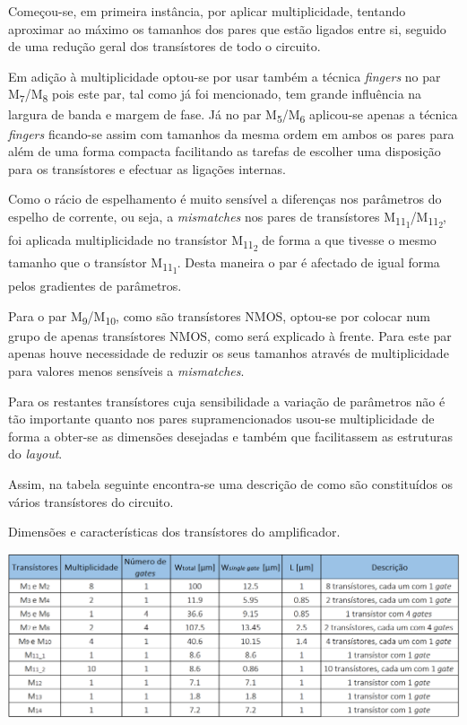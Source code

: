 \documentclass[11pt]{article}
\numberwithin{equation}{section}
\begin{document}
Começou-se, em primeira instância, por aplicar multiplicidade, tentando aproximar ao máximo os tamanhos dos pares que estão ligados entre si, seguido de uma redução geral dos transístores de todo o circuito. 

Em adição à multiplicidade optou-se por usar também a técnica \textit{fingers} no par M\textsubscript{7}/M\textsubscript{8} pois este par, tal como já foi mencionado, tem grande influência na largura de banda e margem de fase. Já no par M\textsubscript{5}/M\textsubscript{6} aplicou-se apenas a técnica \textit{fingers} ficando-se assim com tamanhos da mesma ordem em ambos os pares para além de uma forma compacta facilitando as tarefas de escolher uma disposição para os transístores e efectuar as ligações internas.

Como o rácio de espelhamento é muito sensível a diferenças nos parâmetros do espelho de corrente, ou seja, a \textit{mismatches} nos pares de transístores M\textsubscript{11\textsubscript{1}}/M\textsubscript{11\textsubscript{2}}, foi aplicada multiplicidade no transístor M\textsubscript{11\textsubscript{2}} de forma a que tivesse o mesmo tamanho que o transístor M\textsubscript{11\textsubscript{1}}. Desta maneira o par é afectado de igual forma pelos gradientes de parâmetros.

Para o par M\textsubscript{9}/M\textsubscript{10}, como são transístores NMOS, optou-se por colocar num grupo de apenas transístores NMOS, como será explicado à frente. Para este par apenas houve necessidade de reduzir os seus tamanhos através de multiplicidade para valores menos sensíveis a \textit{mismatches}.

Para os restantes transístores cuja sensibilidade a variação de parâmetros não é tão importante quanto nos pares supramencionados usou-se multiplicidade de forma a obter-se as dimensões desejadas e também que facilitassem as estruturas do \textit{layout}.

Assim, na tabela seguinte encontra-se uma descrição de como são constituídos os vários transístores do circuito.

\begin{table}[H]
	\centering
	\caption{Dimensões e características dos transístores do amplificador.}
	\vspace{-1.5mm}
	\includegraphics[keepaspectratio=true, scale=0.30]{teoricas/dimensoes2}
\end{table}
\end{document}
